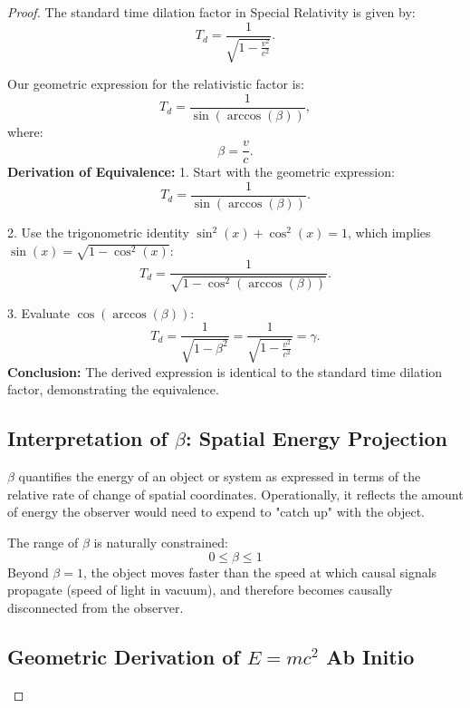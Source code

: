 \documentclass{article}
\begin{document}
\begin{proof}
The standard time dilation factor in Special Relativity is given by:
\begin{equation}
T_d = \frac{1}{\sqrt{1 - \frac{v^2}{c^2}}}.
\end{equation}

Our geometric expression for the relativistic factor is:
\begin{equation}
T_d = \frac{1}{\sin(\arccos(\beta))},
\end{equation}
where:
\begin{equation}
\beta = \frac{v}{c}.
\end{equation}
\textbf{Derivation of Equivalence:}
1. Start with the geometric expression:
\begin{equation}
T_d = \frac{1}{\sin(\arccos(\beta))}.
\end{equation}

2. Use the trigonometric identity \(\sin^2(x) + \cos^2(x) = 1\), which implies \(\sin(x) = \sqrt{1 - \cos^2(x)}\):
\begin{equation}
T_d = \frac{1}{\sqrt{1 - \cos^2(\arccos(\beta))}}.
\end{equation}

3. Evaluate \(\cos(\arccos(\beta))\):
\begin{equation}
T_d = \frac{1}{\sqrt{1 - \beta^2}}= \frac{1}{\sqrt{1 - \frac{v^2}{c^2}}}=\gamma.
\end{equation}
\textbf{Conclusion:} The derived expression is identical to the standard time dilation factor, demonstrating the equivalence.

\subsection{Interpretation of \(\beta\): Spatial Energy Projection}

$\beta$ quantifies the energy of an object or system as expressed in terms of the relative rate of change of spatial coordinates. Operationally, it reflects the amount of energy the observer would need to expend to "catch up" with the object.

The range of \(\beta\) is naturally constrained:
\[
0 \leq \beta \leq 1
\]
Beyond \(\beta = 1\), the object moves faster than the speed at which causal signals propagate (speed of light in vacuum), and therefore becomes causally disconnected from the observer.


\subsection{ Geometric Derivation of \(E = mc^2\) Ab Initio}


\end{proof}
\end{document}
